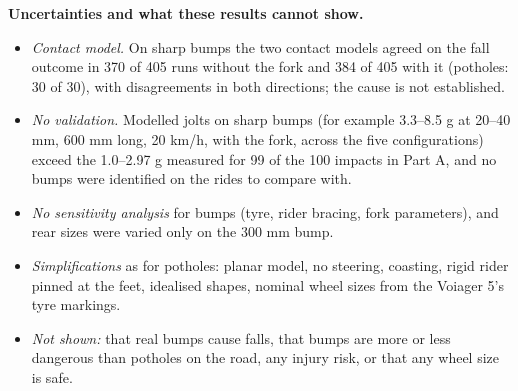 \textbf{Uncertainties and what these results cannot show.}
\begin{itemize}
\item \emph{Contact model.} On sharp bumps the two contact models agreed on the fall outcome
  in 370 of 405 runs without the fork and 384 of 405 with it (potholes: 30 of 30), with
  disagreements in both directions; the cause is not established.
\item \emph{No validation.} Modelled jolts on sharp bumps (for example 3.3--8.5 g at
  20--40 mm, 600 mm long, 20 km/h, with the fork, across the five configurations) exceed the 1.0--2.97 g measured for 99
  of the 100 impacts in Part A, and no bumps were identified on the rides to compare with.
\item \emph{No sensitivity analysis} for bumps (tyre, rider bracing, fork parameters), and
  rear sizes were varied only on the 300 mm bump.
\item \emph{Simplifications} as for potholes: planar model, no steering, coasting, rigid rider
  pinned at the feet, idealised shapes, nominal wheel sizes from the Voiager 5's tyre markings.
\item \emph{Not shown:} that real bumps cause falls, that bumps are more or less dangerous than
  potholes on the road, any injury risk, or that any wheel size is safe.
\end{itemize}
